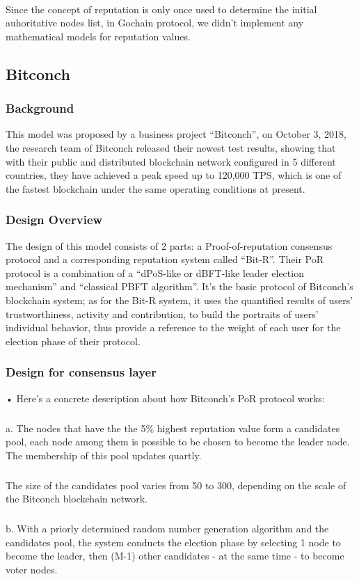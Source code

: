 \documentclass[]{article}
\begin{document}
\begin{CJK*}{UTF8}{gbsn}
	\paragraph{}
	Since the concept of reputation is only once used to determine the initial auhoritative nodes list, in Gochain protocol, we didn't implement any mathematical models for reputation values. 
	
	\subsection{Bitconch} 
	\subsubsection*{Background} 
	This model was proposed by a business project ``Bitconch'', on October 3, 2018, the research team of Bitconch released their newest test results, showing that with their public and distributed blockchain network configured in 5 different countries, they have achieved a peak speed up to 120,000 TPS, which is one of the fastest blockchain under the same operating conditions at present.  
	\subsubsection*{Design Overview}  
	The design of this model consists of 2 parts: a Proof-of-reputation consensus protocol and a corresponding reputation system called ``Bit-R''. Their PoR protocol is a combination of a ``dPoS-like or dBFT-like leader election mechanism'' and ``classical PBFT algorithm''. It's the basic protocol of Bitconch's blockchain system; as for the Bit-R system, it uses the quantified results of users' trustworthiness, activity and contribution, to build the portraits of users' individual behavior, thus provide a reference to the weight of each user for the election phase of their protocol.
	\subsubsection*{Design for consensus layer} 
	• Here's a concrete description about how Bitconch's PoR protocol works:
	\subparagraph{} 
	a. The nodes that have the the 5\% highest reputation value form a candidates pool, each node among them is possible to be chosen to become the leader node. The membership of this pool updates quartly.
	\subparagraph{} 
	The size of the candidates pool varies from 50 to 300, depending on the scale of the Bitconch blockchain network.
	\subparagraph{} 
	b. With a priorly determined random number generation algorithm and the candidates pool, the system conducts the election phase by selecting 1 node to become the leader, then (M-1) other candidates - at the same time - to become voter nodes.

\end{CJK*}
\end{document}
